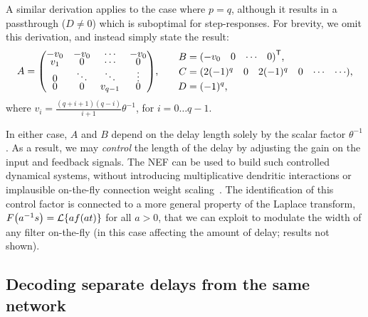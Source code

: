 \documentclass[12pt]{article}
\theoremstyle{definition}
\newcommand{\transpose}[1]{{#1}^\mathsf{T}}
\let\originalleft\left
\let\originalright\right
\renewcommand{\left}{\mathopen{}\mathclose\bgroup\originalleft}
\renewcommand{\right}{\aftergroup\egroup\originalright}
\newenvironment{hpmatrix}{\begingroup\def\arraystretch{0.5}\begin{pmatrix}}{\end{pmatrix}\endgroup\ignorespacesafterend}
\begin{document}
A similar derivation applies to the case where $p = q$, although it results in a passthrough ($D \ne 0$) which is suboptimal for step-responses.
For brevity, we omit this derivation, and instead simply state the result:
\begin{equation*}
    \begin{alignedat}{2}
        A &= \begin{hpmatrix} -v_0 & -v_0 & \cdots & -v_0 \\ v_1 & 0 & \cdots & 0 \\ 0 & \ddots & \ddots & \vdots \\ 0 & 0 & v_{q-1} & 0\end{hpmatrix} \text{,} & & \quad\quad \begin{alignedat}{1}
            B &= \transpose{\begin{hpmatrix}-v_0 & 0 & \cdots & 0\end{hpmatrix}} \text{,} \\
            C &= \begin{hpmatrix} 2(-1)^q & 0 & 2(-1)^q & 0 & \cdots & \cdots \end{hpmatrix} \text{,} \\
            D &= (-1)^q \text{,}
        \end{alignedat}
    \end{alignedat}
\end{equation*}
where $v_i = \frac{(q+i+1)(q-i)}{i+1} \theta^{-1}$, for $i = 0 \ldots q-1$.

In either case, $A$ and $B$ depend on the delay length solely by the scalar factor $\theta^{-1}$.
As a result, we may \emph{control} the length of the delay by adjusting the gain on the input and feedback signals.
The NEF can be used to build such controlled dynamical systems, without introducing multiplicative dendritic interactions or implausible on-the-fly connection weight scaling~\citep{eliasmith2000b}.
The identification of this control factor is connected to a more general property of the Laplace transform, $F \left( a^{-1} s \right) = \mathcal{L} \left\{ a f(at) \right\}$ for all $a > 0$, that we can exploit to modulate the width of any filter on-the-fly (in this case affecting the amount of delay; results not shown).

\subsection{Decoding separate delays from the same network}
\label{app:window}
\end{document}
